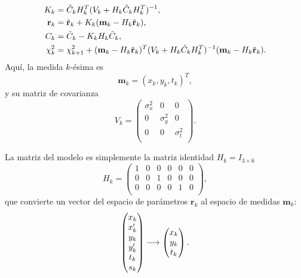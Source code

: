 \documentclass[a4paper]{article}
\let\vec\mathbf  %
\begin{document}
\begin{align}
\notag
K_k &= \tilde{C}_k H_k^T (V_k + H_k \tilde{C}_k H_k^T )^{-1},\\ \notag
\vec{r}_k &= \tilde{\vec{r}}_k + K_k (\vec{m}_k - H_k \tilde{\vec{r}}_k),\\ \notag
C_k &= \tilde{C}_k - K_k H_k \tilde{C}_k,\\
\chi^2_k &= \chi^2_{k+1} + (\vec{m}_k - H_k \tilde{\vec{r}}_k )^T (V_k + H_k \tilde{C}_k H_k^T )^{-1} (\vec{m}_k - H_k \tilde{\vec{r}}_k ).
\label{eq:K}
\end{align}
Aquí, la medida $k$-ésima es
\begin{equation}
\vec{m}_k = (x_k, y_k, t_k)^T,
\label{eq:m}
\end{equation}
y su matriz de covarianza
\begin{equation}
V_k = \left(
\begin{matrix}
\sigma_x^2 & 0                        & 0                      \\
0                        & \sigma_y^2 & 0                       \\
0                        & 0                        & \sigma_t^2 \\
\end{matrix} \right).
\label{eq:V}
\end{equation}

La matriz del modelo es simplemente la matriz identidad $H_k = I_{3 \times 6}$
\begin{equation}
H_k = 
\left(
\begin{matrix}
1 & 0 & 0 & 0 & 0 & 0    \\
0 & 0 & 1 & 0 & 0 & 0     \\
0 & 0 & 0 & 0 & 1 & 0      \\
\end{matrix}\right),
\label{eq:h}
\end{equation}
que convierte un vector del espacio de parámetros $\vec{r}_k$ al espacio de medidas $\vec{m}_k$:
\begin{equation}
    \notag
    \left(
        \begin{matrix}
            x_k \\
            x_k' \\
            y_k \\
            y_k' \\
            t_k \\
            s_k
        \end{matrix}
    \right)
    \longrightarrow
    \left(
        \begin{matrix}
            x_k \\
            y_k \\
            t_k
        \end{matrix}
    \right).
\end{equation}
\end{document}
